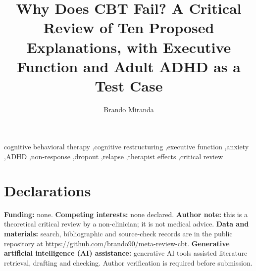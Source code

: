 \documentclass[preprint,12pt,authoryear]{elsarticle}
\begin{document}
\begin{frontmatter}
\title{Why Does CBT Fail? A Critical Review of Ten Proposed Explanations, with Executive Function and Adult ADHD as a Test Case}

\author{Brando Miranda}
\address{Stanford University, Stanford, CA, USA}



\begin{keyword}
cognitive behavioral therapy \sep cognitive restructuring \sep executive function \sep anxiety \sep ADHD \sep non-response \sep dropout \sep relapse \sep therapist effects \sep critical review
\end{keyword}
\end{frontmatter}




















\section*{Declarations}
\textbf{Funding:} none.
\textbf{Competing interests:} none declared.
\textbf{Author note:} this is a theoretical critical review by a non-clinician; it is not medical advice.
\textbf{Data and materials:} search, bibliographic and source-check records are in the public repository at \url{https://github.com/brando90/meta-review-cbt}.
\textbf{Generative artificial intelligence (AI) assistance:} generative AI tools assisted literature retrieval, drafting and checking.
Author verification is required before submission.



\end{document}
